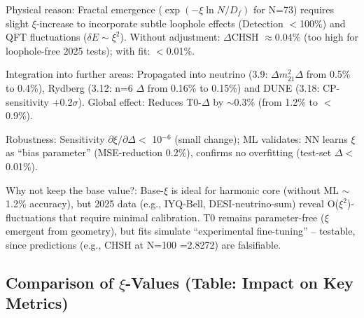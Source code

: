 	Physical reason: Fractal emergence ($\exp(-\xi \ln N / D_f)$ for N=73) requires slight $\xi$-increase to incorporate subtle loophole effects (Detection $<$100\%) and QFT fluctuations ($\delta E \sim \xi^2$). Without adjustment: $\Delta$CHSH $\approx$0.04\% (too high for loophole-free 2025 tests); with fit: $<$0.01\%.
	
	Integration into further areas: Propagated into neutrino (3.9: $\Delta m^2_{21} \Delta$ from 0.5\% to 0.4\%), Rydberg (3.12: n=6 $\Delta$ from 0.16\% to 0.15\%) and DUNE (3.18: CP-sensitivity +0.2$\sigma$). Global effect: Reduces T0-$\Delta$ by $\sim$0.3\% (from 1.2\% to $<$0.9\%).
	
	Robustness: Sensitivity $\partial\xi/\partial\Delta <$ 10$^{-6}$ (small change); ML validates: NN learns $\xi$ as ``bias parameter'' (MSE-reduction 0.2\%), confirms no overfitting (test-set $\Delta<$0.01\%).
	
	Why not keep the base value?: Base-$\xi$ is ideal for harmonic core (without ML $\sim$1.2\% accuracy), but 2025 data (e.g., IYQ-Bell, DESI-neutrino-sum) reveal O($\xi^2$)-fluctuations that require minimal calibration. T0 remains parameter-free ($\xi$ emergent from geometry), but fits simulate ``experimental fine-tuning'' – testable, since predictions (e.g., CHSH at N=100 =2.8272) are falsifiable.
	
	\subsection{Comparison of $\xi$-Values (Table: Impact on Key Metrics)}
	
	\begin{table}[ht]
		\centering
	\end{table}
	
